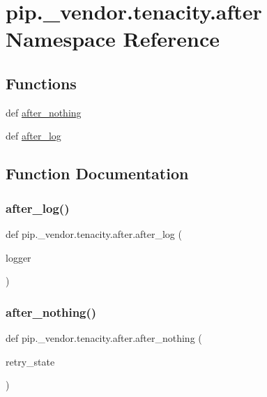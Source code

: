 \hypertarget{namespacepip_1_1__vendor_1_1tenacity_1_1after}{}\section{pip.\+\_\+vendor.\+tenacity.\+after Namespace Reference}
\label{namespacepip_1_1__vendor_1_1tenacity_1_1after}
\subsection*{Functions}
\begin{DoxyCompactItemize}
\item 
def \hyperlink{namespacepip_1_1__vendor_1_1tenacity_1_1after_ad1c01b202a3fb218874b5bbeb3c099ef}{after\+\_\+nothing}
\item 
def \hyperlink{namespacepip_1_1__vendor_1_1tenacity_1_1after_aca86f420eb99104c223986684fde74f8}{after\+\_\+log}
\end{DoxyCompactItemize}


\subsection{Function Documentation}
\mbox{\label{namespacepip_1_1__vendor_1_1tenacity_1_1after_aca86f420eb99104c223986684fde74f8}} 
\subsubsection{\texorpdfstring{after\+\_\+log()}{after\_log()}}
{\footnotesize\ttfamily def pip.\+\_\+vendor.\+tenacity.\+after.\+after\+\_\+log (\begin{DoxyParamCaption}\item[{}]{logger }\end{DoxyParamCaption})}

\mbox{\label{namespacepip_1_1__vendor_1_1tenacity_1_1after_ad1c01b202a3fb218874b5bbeb3c099ef}} 
\subsubsection{\texorpdfstring{after\+\_\+nothing()}{after\_nothing()}}
{\footnotesize\ttfamily def pip.\+\_\+vendor.\+tenacity.\+after.\+after\+\_\+nothing (\begin{DoxyParamCaption}\item[{}]{retry\+\_\+state }\end{DoxyParamCaption})}

